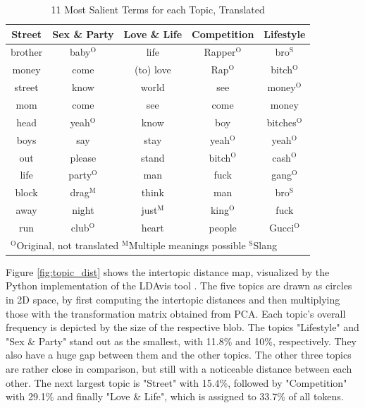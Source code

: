 \documentclass[conference]{IEEEtran}
\begin{document}
\begin{table}[htbp]
\caption{11 Most Salient Terms for each Topic, Translated}
\begin{center}
\begin{tabular}{|c|c|c|c|c|}
\hline
\textbf{Street}&\textbf{Sex \& Party}&\textbf{Love \& Life}&\textbf{Competition}&\textbf{Lifestyle} \\
\cline{1-5}
\hline
brother & baby$^{\mathrm{O}}$ & life & Rapper$^{\mathrm{O}}$ & bro$^{\mathrm{S}}$ \\
\hline
money & come & (to) love & Rap$^{\mathrm{O}}$ & bitch$^{\mathrm{O}}$ \\
\hline
street & know & world & see & money$^{\mathrm{O}}$ \\
\hline
mom & come & see & come & money \\
\hline
head & yeah$^{\mathrm{O}}$ & know & boy & bitches$^{\mathrm{O}}$ \\
\hline
boys & say & stay & yeah$^{\mathrm{O}}$ & yeah$^{\mathrm{O}}$ \\
\hline
out & please & stand & bitch$^{\mathrm{O}}$ & cash$^{\mathrm{O}}$ \\
\hline
life & party$^{\mathrm{O}}$ & man & fuck & gang$^{\mathrm{O}}$ \\
\hline
block & drag$^{\mathrm{M}}$ & think & man & bro$^{\mathrm{S}}$ \\
\hline
away & night & just$^{\mathrm{M}}$ & king$^{\mathrm{O}}$ & fuck \\
\hline
run & club$^{\mathrm{O}}$ & heart & people & Gucci$^{\mathrm{O}}$ \\
\hline
\hline
\multicolumn{5}{l}{$^{\mathrm{O}}$Original, not translated $^{\mathrm{M}}$Multiple meanings possible $^{\mathrm{S}}$Slang}
\end{tabular}
\label{tab:topics}
\end{center}
\end{table}

Figure \ref{fig:topic_dist} shows the intertopic distance map, visualized by the Python implementation of the LDAvis tool \cite{sievert-shirley-2014-ldavis}. The five topics are drawn as circles in 2D space, by first computing the intertopic distances and then multiplying those with the transformation matrix obtained from PCA. Each topic's overall frequency is depicted by the size of the respective blob. The topics "Lifestyle" and "Sex \& Party" stand out as the smallest, with 11.8\% and 10\%, respectively. They also have a huge gap between them and the other topics. The other three topics are rather close in comparison, but still with a noticeable distance between each other. The next largest topic is "Street" with 15.4\%, followed by "Competition" with 29.1\% and finally "Love \& Life", which is assigned to 33.7\% of all tokens.
\end{document}
